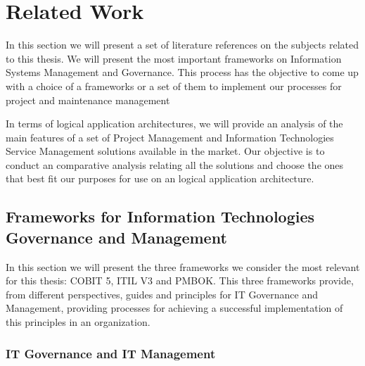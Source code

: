 
% 
% 

\section{Related Work}

In this section we will present a set of literature references on the subjects related to this thesis. We will present the most important frameworks on Information Systems Management and Governance. This process has the objective to come up with a choice of a frameworks or a set of them to implement our processes for project and maintenance management\par
In terms of logical application architectures, we will provide an analysis of the main features of a set of Project Management and Information Technologies Service Management solutions available in the market. Our objective is to conduct an comparative analysis relating all the solutions and choose the ones that best fit our purposes for use on an logical application architecture.  

\subsection{Frameworks for Information Technologies Governance and Management}

In this section we will present the three frameworks we consider the most relevant for this thesis: COBIT 5, ITIL V3 and PMBOK. This three frameworks provide, from different perspectives, guides and principles for IT Governance and Management, providing processes for achieving a successful implementation of this principles in an organization.\par


\subsubsection{IT Governance and IT Management}

